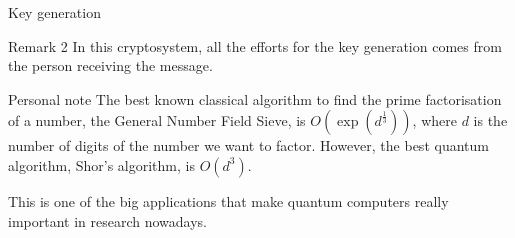 \documentclass[a4paper]{article}
\begin{document}
\begin{parag}{Key generation}
    \begin{subparag}{Remark 2}
        In this cryptosystem, all the efforts for the key generation comes from the person receiving the message.
    \end{subparag}


    \begin{subparag}{Personal note}
        The best known classical algorithm to find the prime factorisation of a number, the General Number Field Sieve, is $O\left(\exp\left(d^{\frac{1}{3}}\right)\right)$, where $d$ is the number of digits of the number we want to factor. However, the best quantum algorithm, Shor's algorithm, is $O\left(d^3\right)$.

        This is one of the big applications that make quantum computers really important in research nowadays.
    \end{subparag}
\end{parag}
\end{document}
